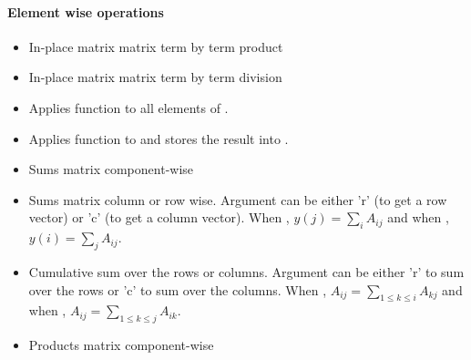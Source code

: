 \paragraph{Element wise operations}

\begin{itemize}
\item {} 
  \sshortdescribe In-place matrix matrix term by term product  

\item {} 
  \sshortdescribe In-place matrix matrix term by term division

\item {} 
  \sshortdescribe Applies function  to all elements of .

\item {} 
  \sshortdescribe Applies function  to  and stores the result
  into .

\item {}
  \sshortdescribe Sums matrix component-wise  

\item {}
  \sshortdescribe Sums matrix column or row wise. Argument  can be
  either 'r' (to get a row vector) or 'c' (to get a column vector). When
  , $y(j) = \sum_i A_{ij}$ and when , $y(i) = \sum_j
  A_{ij}$.

\item {} 
  \sshortdescribe Cumulative sum over the rows or columns. Argument 
  can be either 'r' to sum over the rows or 'c' to sum over the columns. When
  , $A_{ij} = \sum_{1 \le k \le i} A_{kj}$ and when , 
  $A_{ij} = \sum_{1 \le k \le j} A_{ik}$.

\item {}
  \sshortdescribe Products matrix component-wise


\end{itemize}
